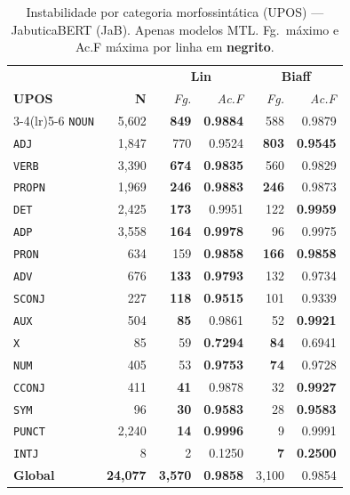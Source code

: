 \clearpage
\begin{table}[p]
\centering
\caption{Instabilidade por categoria morfossint\'atica (UPOS) --- JabuticaBERT (JaB).
Apenas modelos MTL. Fg.\ m\'aximo e Ac.F m\'axima por linha em \textbf{negrito}.}
\label{tab:instab-jab-upos}
\begingroup
\small\setlength{\tabcolsep}{6pt}\renewcommand{\arraystretch}{1.2}%
\begin{tabular}{l r| r r| r r}
\toprule
\multicolumn{2}{c|}{}
  & \multicolumn{2}{c|}{\textbf{Lin}}
  & \multicolumn{2}{c}{\textbf{Biaff}} \\
\textbf{UPOS} & \textbf{N}
  & \textit{Fg.} & \textit{Ac.F}
  & \textit{Fg.} & \textit{Ac.F} \\
\cmidrule(lr){3-4}\cmidrule(lr){5-6}
  \texttt{NOUN} & 5,602 & \textbf{849} & \textbf{0.9884} & 588 & 0.9879 \\
  \texttt{ADJ} & 1,847 & 770 & 0.9524 & \textbf{803} & \textbf{0.9545} \\
  \texttt{VERB} & 3,390 & \textbf{674} & \textbf{0.9835} & 560 & 0.9829 \\
  \texttt{PROPN} & 1,969 & \textbf{246} & \textbf{0.9883} & \textbf{246} & 0.9873 \\
  \texttt{DET} & 2,425 & \textbf{173} & 0.9951 & 122 & \textbf{0.9959} \\
  \texttt{ADP} & 3,558 & \textbf{164} & \textbf{0.9978} & 96 & 0.9975 \\
  \texttt{PRON} & 634 & 159 & \textbf{0.9858} & \textbf{166} & \textbf{0.9858} \\
  \texttt{ADV} & 676 & \textbf{133} & \textbf{0.9793} & 132 & 0.9734 \\
  \texttt{SCONJ} & 227 & \textbf{118} & \textbf{0.9515} & 101 & 0.9339 \\
  \texttt{AUX} & 504 & \textbf{85} & 0.9861 & 52 & \textbf{0.9921} \\
  \texttt{X} & 85 & 59 & \textbf{0.7294} & \textbf{84} & 0.6941 \\
  \texttt{NUM} & 405 & 53 & \textbf{0.9753} & \textbf{74} & 0.9728 \\
  \texttt{CCONJ} & 411 & \textbf{41} & 0.9878 & 32 & \textbf{0.9927} \\
  \texttt{SYM} & 96 & \textbf{30} & \textbf{0.9583} & 28 & \textbf{0.9583} \\
  \texttt{PUNCT} & 2,240 & \textbf{14} & \textbf{0.9996} & 9 & 0.9991 \\
  \texttt{INTJ} & 8 & 2 & 0.1250 & \textbf{7} & \textbf{0.2500} \\
\midrule
  \textbf{Global} & \textbf{24,077} & \textbf{3,570} & \textbf{0.9858} & 3,100 & 0.9854 \\
\bottomrule
\end{tabular}
\endgroup
\instablegendaMTL
\end{table}

